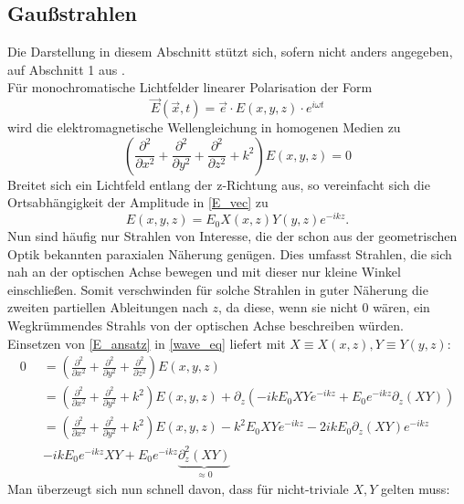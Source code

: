 \documentclass[11pt,a4paper,oneside]{scrartcl}
\begin{document}
\subsection{Gaußstrahlen}
Die Darstellung in diesem Abschnitt stützt sich, sofern nicht anders angegeben, auf Abschnitt 1 aus \cite{versuchsanleitung}. \\
Für monochromatische Lichtfelder linearer Polarisation der Form 
\begin{equation}\label{E_vec}
\vec E(\vec x,t)=\vec e\cdot E(x,y,z)\cdot e^{i\omega t}
\end{equation}
wird die elektromagnetische Wellengleichung in homogenen Medien zu
\begin{equation}\label{wave_eq}
\left(\frac{\partial^2}{\partial x^2}+\frac{\partial^2}{\partial y^2}+\frac{\partial^2}{\partial z^2}+k^2\right)E(x,y,z)=0
\end{equation}
Breitet sich ein Lichtfeld entlang der z-Richtung aus, so vereinfacht sich die Ortsabhängigkeit der Amplitude in \ref{E_vec} zu 
\begin{equation}\label{E_ansatz}
E(x,y,z)=E_0X(x,z)Y(y,z)e^{-ikz}.
\end{equation}
Nun sind häufig nur Strahlen von Interesse, die der schon aus der geometrischen Optik bekannten paraxialen Näherung genügen. Dies umfasst Strahlen, die sich nah an der optischen Achse bewegen und mit dieser nur kleine Winkel einschließen. Somit verschwinden für solche Strahlen in guter Näherung die zweiten partiellen Ableitungen nach $z$, da diese, wenn sie nicht $0$ wären, ein \glqq Wegkrümmen\grqq des Strahls von der optischen Achse beschreiben würden.\\
Einsetzen von \ref{E_ansatz} in \ref{wave_eq} liefert mit $X\equiv X(x,z), Y\equiv Y(y,z)$:
\begin{align}
0&=\left(\frac{\partial^2}{\partial x^2}+\frac{\partial^2}{\partial y^2}+\frac{\partial^2}{\partial z^2}\right)E(x,y,z) \\ \quad&
=\left(\frac{\partial^2}{\partial x^2}+\frac{\partial^2}{\partial y^2}+k^2\right)E(x,y,z)+\partial_z\left(-ikE_0XYe^{-ikz}+E_0e^{-ikz}\partial_z(XY)\right) \\ \quad&
=\left(\frac{\partial^2}{\partial x^2}+\frac{\partial^2}{\partial y^2}+k^2\right)E(x,y,z)-k^2E_0XYe^{-ikz}-2ikE_0\partial_z(XY)e^{-ikz}\\ \quad& -ikE_0e^{-ikz}XY+E_0e^{-ikz}\underbrace{\partial_z^2(XY)}_{\approx 0}
\end{align}
Man überzeugt sich nun schnell davon, dass für nicht-triviale $X,Y$ gelten muss:
\end{document}
